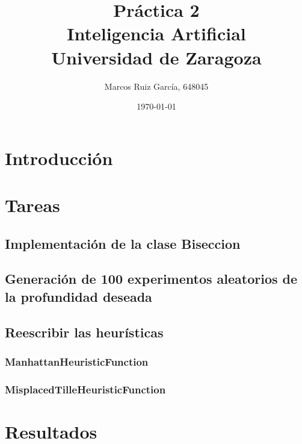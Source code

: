 \documentclass[a4paper]{article}
\title{Práctica 2 \\ Inteligencia Artificial \\ \large Universidad de Zaragoza}
\author{Marcos Ruiz García, 648045}
\date{\today}
\begin{document}
\maketitle

\tableofcontents

\section{Introducción}

\section{Tareas}


\subsection{Implementación de la clase Biseccion}


\subsection{Generación de 100 experimentos aleatorios de la profundidad deseada}

\subsection{Reescribir las heurísticas}

\subsubsection{ManhattanHeuristicFunction}

\subsubsection{MisplacedTilleHeuristicFunction}

\section{Resultados}
\end{document}
